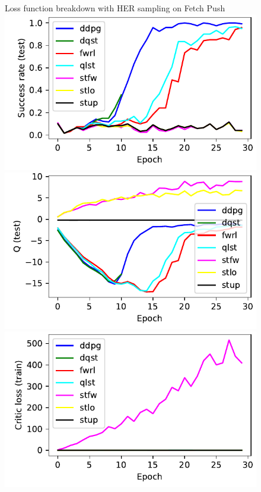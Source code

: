 \begin{figure}
Loss function breakdown with HER sampling on Fetch Push\\
  \includegraphics[width=\frac\columnwidth]{media/res/3f1eafe-FetchPush-v1-stfw-future/test/success_rate.pdf}%
  \includegraphics[width=\frac\columnwidth]{media/res/3f1eafe-FetchPush-v1-stfw-future/test/mean_Q.pdf}%
  \includegraphics[width=\frac\columnwidth]{media/res/3f1eafe-FetchPush-v1-stfw-future/train/critic_loss.pdf}%

\end{figure}
